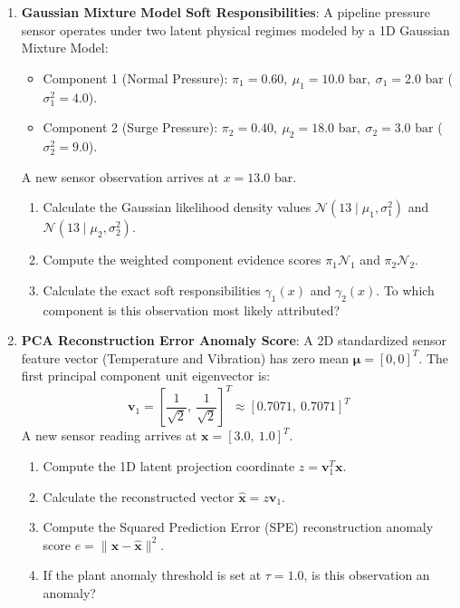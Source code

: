 \begin{checkyourself}
\begin{enumerate}
    \item \textbf{Gaussian Mixture Model Soft Responsibilities}:
    A pipeline pressure sensor operates under two latent physical regimes modeled by a 1D Gaussian Mixture Model:
    \begin{itemize}
        \item Component 1 (Normal Pressure): $\pi_1 = 0.60, \ \mu_1 = 10.0\text{ bar}, \ \sigma_1 = 2.0\text{ bar}$ ($\sigma_1^2 = 4.0$).
        \item Component 2 (Surge Pressure): $\pi_2 = 0.40, \ \mu_2 = 18.0\text{ bar}, \ \sigma_2 = 3.0\text{ bar}$ ($\sigma_2^2 = 9.0$).
    \end{itemize}
    A new sensor observation arrives at $x = 13.0\text{ bar}$.
    \begin{enumerate}[label=(\alph*)]
        \item Calculate the Gaussian likelihood density values $\mathcal{N}(13 \mid \mu_1, \sigma_1^2)$ and $\mathcal{N}(13 \mid \mu_2, \sigma_2^2)$.
        \item Compute the weighted component evidence scores $\pi_1 \mathcal{N}_1$ and $\pi_2 \mathcal{N}_2$.
        \item Calculate the exact soft responsibilities $\gamma_1(x)$ and $\gamma_2(x)$. To which component is this observation most likely attributed?
    \end{enumerate}

    \item \textbf{PCA Reconstruction Error Anomaly Score}:
    A 2D standardized sensor feature vector (Temperature and Vibration) has zero mean $\boldsymbol{\mu} = [0, 0]^T$. The first principal component unit eigenvector is:
    \begin{equation*}
    \mathbf{v}_1 = \left[ \frac{1}{\sqrt{2}}, \ \frac{1}{\sqrt{2}} \right]^T \approx [0.7071, \ 0.7071]^T
    \end{equation*}
    A new sensor reading arrives at $\mathbf{x} = [3.0, \ 1.0]^T$.
    \begin{enumerate}[label=(\alph*)]
        \item Compute the 1D latent projection coordinate $z = \mathbf{v}_1^T \mathbf{x}$.
        \item Calculate the reconstructed vector $\hat{\mathbf{x}} = z \mathbf{v}_1$.
        \item Compute the Squared Prediction Error (SPE) reconstruction anomaly score $e = \|\mathbf{x} - \hat{\mathbf{x}}\|^2$.
        \item If the plant anomaly threshold is set at $\tau = 1.0$, is this observation an anomaly?
    \end{enumerate}


\end{enumerate}
\end{checkyourself}
